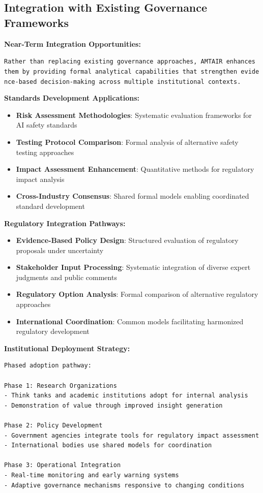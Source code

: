 \documentclass[
  11pt,
  letterpaper,
]{book}
\providecommand{\tightlist}{%
  \setlength{\itemsep}{0pt}\setlength{\parskip}{0pt}}
\begin{document}
\subsection{Integration with Existing Governance
Frameworks}\label{sec-framework-integration}

\textbf{Near-Term Integration Opportunities:}

\texttt{Rather\ than\ replacing\ existing\ governance\ approaches,\ AMTAIR\ enhances\ them\ by\ providing\ formal\ analytical\ capabilities\ that\ strengthen\ evidence-based\ decision-making\ across\ multiple\ institutional\ contexts.}

\textbf{Standards Development Applications:}

\begin{itemize}
\tightlist
\item
  \textbf{Risk Assessment Methodologies}: Systematic evaluation
  frameworks for AI safety standards
\item
  \textbf{Testing Protocol Comparison}: Formal analysis of alternative
  safety testing approaches
\item
  \textbf{Impact Assessment Enhancement}: Quantitative methods for
  regulatory impact analysis
\item
  \textbf{Cross-Industry Consensus}: Shared formal models enabling
  coordinated standard development
\end{itemize}

\textbf{Regulatory Integration Pathways:}

\begin{itemize}
\tightlist
\item
  \textbf{Evidence-Based Policy Design}: Structured evaluation of
  regulatory proposals under uncertainty
\item
  \textbf{Stakeholder Input Processing}: Systematic integration of
  diverse expert judgments and public comments
\item
  \textbf{Regulatory Option Analysis}: Formal comparison of alternative
  regulatory approaches
\item
  \textbf{International Coordination}: Common models facilitating
  harmonized regulatory development
\end{itemize}

\textbf{Institutional Deployment Strategy:}

\begin{verbatim}
Phased adoption pathway:

Phase 1: Research Organizations
- Think tanks and academic institutions adopt for internal analysis
- Demonstration of value through improved insight generation

Phase 2: Policy Development  
- Government agencies integrate tools for regulatory impact assessment
- International bodies use shared models for coordination

Phase 3: Operational Integration
- Real-time monitoring and early warning systems
- Adaptive governance mechanisms responsive to changing conditions
\end{verbatim}
\end{document}
